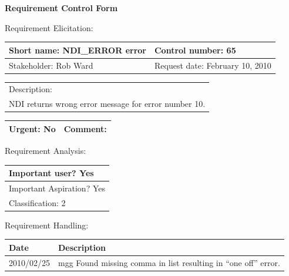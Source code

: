 \begin{center}\Large\bf
Requirement Control Form
\end{center}
\vspace{24pt}

Requirement Elicitation:

\begin{tabular}{|p{211pt}|p{211pt}|} \hline
Short name: NDI\_ERROR error & Control number: 65\\ \hline
Stakeholder: Rob Ward & Request date: February 10, 2010\\
\end{tabular}
\begin{tabular}{|p{433pt}|} \hline
Description: \\ 
NDI returns wrong error message for error number 10.
\\ \hline
\end{tabular} 
\begin{tabular}{|p{211pt}|p{211pt}|} \hline
Urgent: No & Comment: 
\\ \hline
\end{tabular}

\vspace{24pt}

Requirement Analysis:

\begin{tabular}{|p{433pt}|} \hline
Important user? Yes \\ \hline
Important Aspiration? Yes \\ \hline
Classification: 2 \\ \hline
\end{tabular}
\vspace{24pt}

Requirement Handling:

\begin{tabular}{|p{72pt}|p{351pt}|} \hline
Date & Description \\ \hline
2010/02/25 & mgg Found missing comma in list resulting in ``one off'' error. \\ \hline
\end{tabular}
